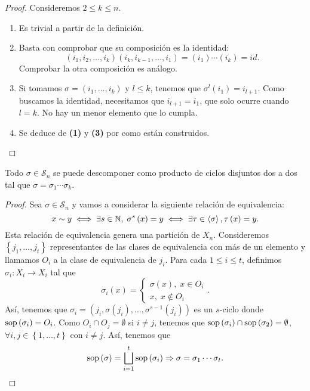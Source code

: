 \begin{proof}
Consideremos $\displaystyle 2 \leq k \leq n $.
\begin{enumerate}
\item Es trivial a partir de la definición. 
\item Basta con comprobar que su composición es la identidad:
	\[ \left(i_{1}, i_{2}, \ldots, i_{k}\right)\left(i_{k}, i_{k-1}, \ldots, i_{1}\right) = \left(i_{1}\right) \cdots \left(i_{k}\right) = id .\]
Comprobar la otra composición es análogo. 
\item Si tomamos $\displaystyle \sigma = \left(i_{1}, \ldots, i_{k}\right) $ y $\displaystyle l \leq k $, tenemos que $\displaystyle \sigma^{l}\left(i_{1}\right) = i_{l+1} $. Como buscamos la identidad, necesitamos que $\displaystyle i_{l+1} = i_{1} $, que solo ocurre cuando $\displaystyle l = k $. No hay un menor elemento que lo cumpla.
\item Se deduce de \textbf{(1)} y \textbf{(3)} por como están construidos. 
\end{enumerate}
\end{proof}
\begin{prop}
Todo $\displaystyle \sigma \in \mathcal{S}_{n} $ se puede descomponer como producto de ciclos disjuntos dos a dos tal que $\displaystyle \sigma = \sigma_{1} \cdots \sigma_{k} $.
\end{prop}
\begin{proof}
Sea $\displaystyle \sigma \in \mathcal{S}_{n} $ y vamos a considerar la siguiente relación de equivalencia:
\[x \sim y \iff \exists s \in \mathbb{N}, \; \sigma^{s}\left(x\right) = y \iff \exists \tau \in \left\langle \sigma  \right\rangle , \tau\left(x\right) = y .\]
Esta relación de equivalencia genera una partición de $\displaystyle X_{n} $. Consideremos $\displaystyle \left\{ j_{1}, \ldots, j_{t}\right\}  $ representantes de las clases de equivalencia con más de un elemento y llamamos $\displaystyle O_{i} $ a la clase de equivalencia de $\displaystyle j_{i} $. Para cada $\displaystyle 1 \leq i \leq t $, definimos $\displaystyle \sigma_{i} : X_{i} \to X_{i} $ tal que 
\[\sigma_{i}\left(x\right) = 
\begin{cases}
\sigma\left(x\right), \; x \in O_{i} \\ 
x, \; x \not\in O_{i}
\end{cases}
.\]
Así, tenemos que $\displaystyle \sigma_{i} = \left(j_{i}, \sigma\left(j_{i}\right), \ldots, \sigma^{s-1}\left(j_{i}\right)\right) $ es un $\displaystyle s $-ciclo donde $\displaystyle \operatorname{sop}\left(\sigma _{i}\right) = O_{i} $. Como $\displaystyle O_{i} \cap O_{j} = \emptyset $ si $\displaystyle i \neq j $, tenemos que $\displaystyle \operatorname{sop}\left(\sigma _{i}\right) \cap \operatorname{sop}\left(\sigma _{2}\right) = \emptyset $, $\displaystyle \forall i,j \in \left\{ 1, \ldots, t\right\}  $ con $\displaystyle i \neq j $. Así, tenemos que 
\[\operatorname{sop}\left(\sigma \right) = \bigsqcup^{t}_{i = 1}\operatorname{sop}\left(\sigma_{i}\right) \Rightarrow \sigma = \sigma _{1} \cdots \sigma _{t} .\]
\end{proof}
